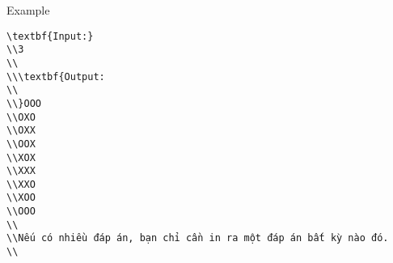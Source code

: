 Example
\begin{verbatim}
\textbf{Input:}
\\3
\\
\\\textbf{Output:
\\
\\}OOO
\\OXO
\\OXX
\\OOX
\\XOX
\\XXX
\\XXO
\\XOO
\\OOO
\\
\\Nếu có nhiều đáp án, bạn chỉ cần in ra một đáp án bất kỳ nào đó.
\\\end{verbatim}